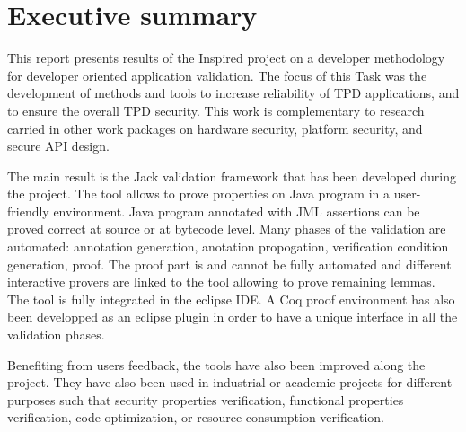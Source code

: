 \section{Executive summary}

This report presents results of the Inspired project on a developer
methodology for developer oriented application validation. The focus
of this Task was the development of methods and tools to increase
reliability of TPD applications, and to ensure the overall TPD
security.  This work is complementary to research carried in other
work packages on hardware security, platform security, and secure API
design.

The main result is the Jack validation framework that has been
developed during the project. The tool allows to prove properties on
Java program in a user-friendly environment. Java program annotated
with JML assertions can be proved correct at source or at bytecode
level. Many phases of the validation are automated: annotation
generation, anotation propogation, verification condition generation,
proof. The proof part is and cannot be fully automated and different
interactive provers are linked to the tool allowing to prove remaining
lemmas. The tool is fully integrated in the eclipse IDE. A Coq proof
environment has also been developped as an eclipse plugin in order to
have a unique interface in all the validation phases.


Benefiting from users feedback, the tools have also been improved
along the project. They have also been used in industrial or academic
projects for different purposes such that security properties
verification, functional properties verification, code optimization,
or resource consumption verification.
